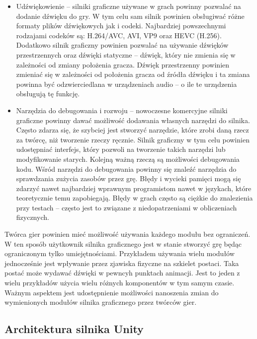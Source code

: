 \documentclass[12pt,twoside]{article}
\begin{document}
\begin{itemize}
\item Udźwiękowienie -- silniki graficzne używane w grach powinny pozwalać na
dodanie dźwięku do gry. W tym celu sam silnik powinien obsługiwać różne formaty
plików dźwiękowych jak i codeki. Najbardziej powszechnymi rodzajami codeków są:
H.264/AVC, AVI, VP9 oraz HEVC (H.256). Dodatkowo silnik graficzny powinien
pozwalać na używanie dźwięków przestrzennych oraz dźwięki statyczne -- dźwięk,
który nie zmienia się w zależności od zmiany położenia gracza. Dźwięk
przestrzenny powinien zmieniać się w zależności od położenia gracza od źródła
dźwięku i ta zmiana powinna być odzwierciedlana w urządzeniach audio – o ile te
urządzenia obsługują tę funkcję. 

\item Narzędzia do debugowania i rozwoju -- nowoczesne komercyjne
silniki graficzne powinny dawać możliwość dodawania własnych narzędzi do
silnika. Często zdarza się, że szybciej jest stworzyć narzędzie, które zrobi
daną rzecz za twórcę, niż tworzenie rzeczy ręcznie. Silnik graficzny w tym celu
powinien udostępniać interfejs, który pozwoli na tworzenie takich narzędzi lub
modyfikowanie starych. Kolejną ważną rzeczą są możliwości debugowania kodu.
Wśród narzędzi do debugowania powinny się znaleźć narzędzia do sprawdzania
zużycia zasobów przez grę. Błędy i wycieki pamięci mogą się zdarzyć nawet
najbardziej wprawnym programistom nawet w językach, które teoretycznie temu
zapobiegają. Błędy w grach często są ciężkie do znalezienia przy testach
-- często jest to związane z niedopatrzeniami w obliczeniach
fizycznych. 

\end{itemize}

Twórca gier powinien mieć możliwość używania każdego modułu bez ograniczeń. W
ten sposób użytkownik silnika graficznego jest w stanie stworzyć grę będąc
ograniczonym tylko umiejętnościami. Przykładem używania wielu modułów
jednocześnie jest wpływanie przez zjawiska fizyczne na szkielet postaci. Taka
postać może wydawać dźwięki w pewncyh punktach animacji. Jest to jeden z wielu
przykładów użycia wielu różnych komponentów w tym samym czasie. Ważnym aspektem
jest udostępnienie możliwości nanoszenia zmian do wymienionych modułów silnika
graficznego przez twórców gier. 

\clearpage

\subsection{Architektura silnika Unity}
\end{document}
